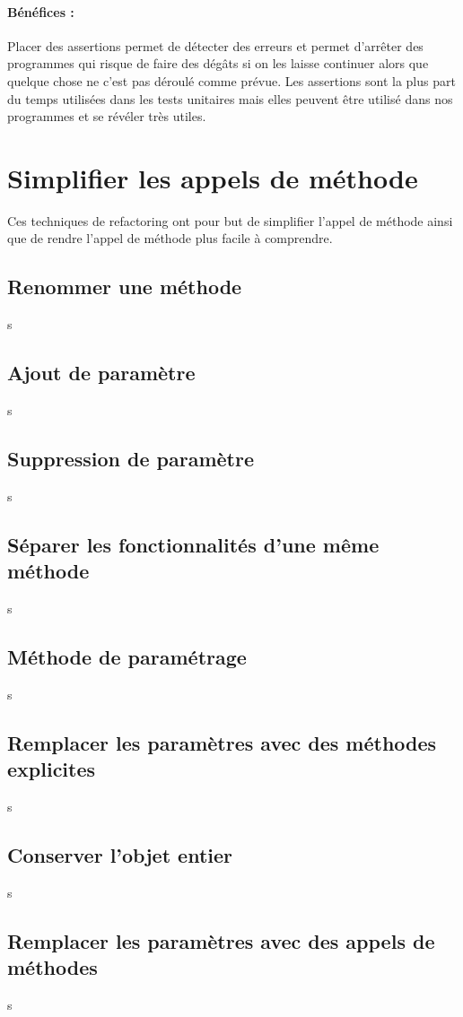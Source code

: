 \documentclass[a4paper,twoside,12pt,openright]{report}
\begin{document}
\paragraph{Bénéfices :}
Placer des assertions permet de détecter des erreurs et permet d'arrêter des programmes qui risque de faire des dégâts si on les laisse continuer alors que quelque chose ne c'est pas déroulé comme prévue.
Les assertions sont la plus part du temps utilisées dans les tests unitaires mais elles peuvent être utilisé dans nos programmes et se révéler très utiles.

\newpage
\section{Simplifier les appels de méthode}
Ces techniques de refactoring ont pour but de simplifier l'appel de méthode ainsi que de rendre l'appel de méthode plus facile à comprendre.




\subsection{Renommer une méthode}
s
\subsection{Ajout de paramètre}
s
\subsection{Suppression de paramètre}
s
\subsection{Séparer les fonctionnalités d'une même méthode}
s
\subsection{Méthode de paramétrage}
s
\subsection{Remplacer les paramètres avec des méthodes explicites}
s
\subsection{Conserver l'objet entier}
s
\subsection{Remplacer les paramètres avec des appels de méthodes}
s
\end{document}
